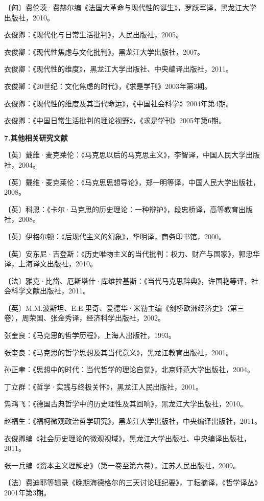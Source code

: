 \documentclass[UTF8, fontset = sourcesans, a4paper, oneside, zihao =
-4, scheme=chinese, no-math, space=true]{ctexbook}
\begin{document}
〔匈〕费伦茨·费赫尔编《法国大革命与现代性的诞生》，罗跃军译，黑龙江大学出版社，2010。

衣俊卿：《现代化与日常生活批判》，人民出版社，2005。

衣俊卿：《现代性焦虑与文化批判》，黑龙江大学出版社，2007。

衣俊卿：《现代性的维度》，黑龙江大学出版社、中央编译出版社，2011。

衣俊卿：《20世纪：文化焦虑的时代》，《求是学刊》2003年第3期。

衣俊卿：《现代性的维度及其当代命运》，《中国社会科学》2004年第4期。

衣俊卿：《中国日常生活批判的理论视野》，《求是学刊》2005年第6期。

\textbf{7.其他相关研究文献}

〔英〕戴维·麦克莱伦：《马克思以后的马克思主义》，李智译，中国人民大学出版社，2004。

〔英〕戴维·麦克莱伦：《马克思思想导论》，郑一明等译，中国人民大学出版社，2008。

〔英〕科恩：《卡尔·马克思的历史理论：一种辩护》，段忠桥译，高等教育出版社，2008。

〔英〕伊格尔顿：《后现代主义的幻象》，华明译，商务印书馆，2000。

〔英〕安东尼·吉登斯：《历史唯物主义的当代批判：权力、财产与国家》，郭忠华译，上海译文出版社，2010。

〔法〕雅克·比岱、厄斯塔什·库维拉基斯：《当代马克思辞典》，许国艳等译，社会科学文献出版社，2011。

〔英〕M.M.波斯坦、E.E.里奇、爱德华·米勒主编《剑桥欧洲经济史》（第三卷），周荣国、张金秀译，经济科学出版社，2002。

张奎良：《马克思的哲学历程》，上海人出版社，1993。

张奎良：《马克思的哲学思想及其当代意义》，黑龙江教育出版社，2001。

孙正聿：《思想中的时代：当代哲学的理论自觉》，北京师范大学出版社，2004。

丁立群：《哲学·实践与终极关怀》，黑龙江人民出版社，2001。

隽鸿飞：《德国古典哲学中的历史理性及其回响》，黑龙江大学出版社，2010。

赵福生：《福柯微观政治哲学研究》，黑龙江大学出版社，中央编译出版社，2011。

衣俊卿编《社会历史理论的微观视域》，黑龙江大学出版社、中央编译出版社，2011。

张一兵编《资本主义理解史》（第一卷至第六卷），江苏人民出版社，2009。

〔法〕费迪耶等辑录《晚期海德格尔的三天讨论班纪要》，丁耘摘译，《哲学译丛》2001年第3期。
\end{document}
